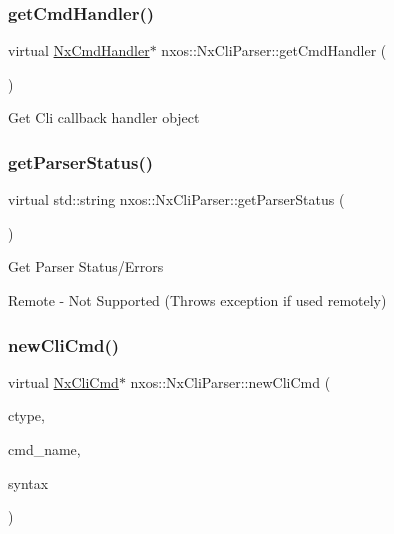 \subsubsection{\texorpdfstring{get\+Cmd\+Handler()}{getCmdHandler()}}
{\footnotesize\ttfamily virtual \mbox{\hyperlink{classnxos_1_1_nx_cmd_handler}{Nx\+Cmd\+Handler}}$\ast$ nxos\+::\+Nx\+Cli\+Parser\+::get\+Cmd\+Handler (\begin{DoxyParamCaption}{ }\end{DoxyParamCaption})\hspace{0.3cm}{\ttfamily [pure virtual]}}

Get Cli callback handler object \mbox{\label{classnxos_1_1_nx_cli_parser_a5a6839c678451ecbb78449df6960cf8c}} 
\subsubsection{\texorpdfstring{get\+Parser\+Status()}{getParserStatus()}}
{\footnotesize\ttfamily virtual std\+::string nxos\+::\+Nx\+Cli\+Parser\+::get\+Parser\+Status (\begin{DoxyParamCaption}{ }\end{DoxyParamCaption})\hspace{0.3cm}{\ttfamily [pure virtual]}}

Get Parser Status/\+Errors

\begin{DoxyVerb}Remote - Not Supported (Throws exception if used remotely)\end{DoxyVerb}
 \mbox{\label{classnxos_1_1_nx_cli_parser_a210cbbb8b312093285741f753c4cdcda}} 
\subsubsection{\texorpdfstring{new\+Cli\+Cmd()}{newCliCmd()}}
{\footnotesize\ttfamily virtual \mbox{\hyperlink{classnxos_1_1_nx_cli_cmd}{Nx\+Cli\+Cmd}}$\ast$ nxos\+::\+Nx\+Cli\+Parser\+::new\+Cli\+Cmd (\begin{DoxyParamCaption}\item[{\mbox{\hyperlink{classnxos_1_1_nx_cli_cmd_a82ed104f13c7859b24d3c0527f706be1}{Nx\+Cli\+Cmd\+::cmdtype\+\_\+t}}}]{ctype,  }\item[{const char $\ast$}]{cmd\+\_\+name,  }\item[{const char $\ast$}]{syntax }\end{DoxyParamCaption})\hspace{0.3cm}{\ttfamily [pure virtual]}}

